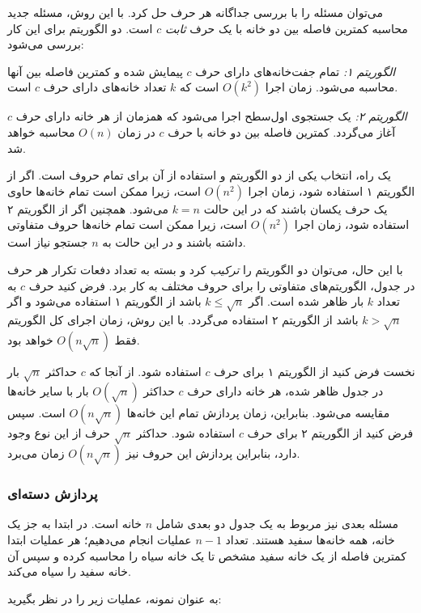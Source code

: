 می‌توان مسئله را با بررسی جداگانه هر حرف حل کرد.
با این روش، مسئله جدید محاسبه کمترین فاصله
بین دو خانه با یک حرف \emph{ثابت} $c$ است.
دو الگوریتم برای این کار بررسی می‌شود:

\emph{الگوریتم ۱:} تمام جفت‌خانه‌های دارای حرف $c$ پیمایش شده
و کمترین فاصله بین آنها محاسبه می‌شود.
زمان اجرا $O(k^2)$ است که $k$ تعداد خانه‌های دارای حرف $c$ است.

\emph{الگوریتم ۲:} یک جستجوی اول‌سطح اجرا می‌شود که همزمان
از هر خانه دارای حرف $c$ آغاز می‌گردد. کمترین فاصله بین
دو خانه با حرف $c$ در زمان $O(n)$ محاسبه خواهد شد.

یک راه، انتخاب یکی از دو الگوریتم
و استفاده از آن برای تمام حروف است.
اگر از الگوریتم ۱ استفاده شود، زمان اجرا $O(n^2)$ است،
زیرا ممکن است تمام خانه‌ها حاوی یک حرف یکسان باشند
که در این حالت $k=n$ می‌شود.
همچنین اگر از الگوریتم ۲ استفاده شود، زمان اجرا $O(n^2)$ است،
زیرا ممکن است تمام خانه‌ها حروف متفاوتی داشته باشند
و در این حالت به $n$ جستجو نیاز است.

با این حال، می‌توان دو الگوریتم را \emph{ترکیب} کرد و
بسته به تعداد دفعات تکرار هر حرف در جدول،
الگوریتم‌های متفاوتی را برای حروف مختلف به کار برد.
فرض کنید حرف $c$ به تعداد $k$ بار ظاهر شده است.
اگر $k \le \sqrt n$ باشد از الگوریتم ۱ استفاده می‌شود و اگر $k > \sqrt n$ باشد
از الگوریتم ۲ استفاده می‌گردد.
با این روش، زمان اجرای کل الگوریتم
فقط $O(n \sqrt n)$ خواهد بود.

نخست فرض کنید از الگوریتم ۱ برای حرف $c$ استفاده شود.
از آنجا که $c$ حداکثر $\sqrt n$ بار در جدول ظاهر شده،
هر خانه دارای حرف $c$ حداکثر $O(\sqrt n)$ بار
با سایر خانه‌ها مقایسه می‌شود.
بنابراین، زمان پردازش تمام این خانه‌ها $O(n \sqrt n)$ است.
سپس فرض کنید از الگوریتم ۲ برای حرف $c$ استفاده شود.
حداکثر $\sqrt n$ حرف از این نوع وجود دارد،
بنابراین پردازش این حروف نیز $O(n \sqrt n)$ زمان می‌برد.

\subsubsection{پردازش دسته‌ای}

مسئله بعدی نیز مربوط به
یک جدول دو بعدی شامل $n$ خانه است.
در ابتدا به جز یک خانه، همه خانه‌ها سفید هستند.
تعداد $n-1$ عملیات انجام می‌دهیم؛ هر عملیات ابتدا
کمترین فاصله از یک خانه سفید مشخص تا یک خانه سیاه را محاسبه کرده
و سپس آن خانه سفید را سیاه می‌کند.

به عنوان نمونه، عملیات زیر را در نظر بگیرید:

\begin{center}
\end{center}

